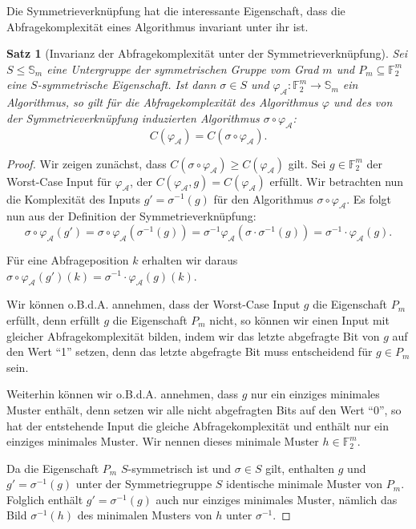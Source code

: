 \documentclass[10pt,a4paper, footheight=1mm]{scrreprt}
\newtheorem{Satz}[definition]{Satz}
\theoremstyle{definition}
\begin{document}
Die Symmetrieverknüpfung hat die interessante Eigenschaft,
dass die Abfragekomplexität eines Algorithmus invariant unter
ihr ist.

\begin{Satz}[Invarianz der Abfragekomplexität unter der Symmetrieverknüpfung]
Sei $S\leq \mathbb{S}_m$ eine Untergruppe der symmetrischen Gruppe vom
Grad $m$ und $P_m \subseteq\mathbb{F}_2^m$ eine $S$-symmetrische
Eigenschaft. Ist dann $\sigma \in S$ und
$\varphi_\mathcal{A}:\mathbb{F}_2^m \to \mathbb{S}_m$ ein Algorithmus,
so gilt für die Abfragekomplexität des Algorithmus $\varphi$
und des von der Symmetrieverknüpfung induzierten Algorithmus
$\sigma \circ \varphi_\mathcal{A}$:
$$C(\varphi_\mathcal{A}) = C(\sigma \circ \varphi_\mathcal{A}).$$
\end{Satz}
\begin{proof}
Wir zeigen zunächst, dass 
$C(\sigma \circ \varphi_\mathcal{A}) \geq C(\varphi_\mathcal{A})$ gilt. 
Sei $g\in\mathbb{F}_2^m$ der Worst-Case Input für $\varphi_\mathcal{A}$,
der $C(\varphi_\mathcal{A}, g) = C(\varphi_\mathcal{A})$ erfüllt.
Wir betrachten nun die Komplexität des Inputs $g' = \sigma^{-1}(g)$
für den Algorithmus $\sigma \circ \varphi_\mathcal{A}$.
Es folgt nun aus der Definition der Symmetrieverknüpfung:
\begin{equation}
\label{eq:Symmetrie}
\sigma \circ \varphi_\mathcal{A} (g')
= \sigma \circ \varphi_\mathcal{A} (\sigma^{-1}(g)) 
= \sigma^{-1} \varphi_\mathcal{A}(\sigma \cdot \sigma^{-1} (g))
= \sigma^{-1} \cdot \varphi_\mathcal{A}(g).
\end{equation}

Für eine Abfrageposition $k$ erhalten wir daraus 
$\sigma \circ \varphi_\mathcal{A}(g')(k) 
= \sigma^{-1} \cdot \varphi_\mathcal{A}(g)(k)$.

Wir können o.B.d.A. annehmen, dass der Worst-Case Input $g$ die
Eigenschaft $P_m$ erfüllt, denn erfüllt $g$ die Eigenschaft
$P_m$ nicht, so können wir einen Input  mit gleicher
Abfragekomplexität bilden, indem wir das letzte abgefragte
Bit von $g$ auf den Wert "`1"' setzen, denn das letzte
abgefragte Bit muss entscheidend für $g\in P_m$ sein.

Weiterhin können wir o.B.d.A. annehmen, dass $g$ nur 
ein einziges minimales Muster enthält, denn setzen wir
alle nicht abgefragten Bits auf den Wert "`0"', so hat
der entstehende Input die gleiche Abfragekomplexität
und enthält nur ein einziges minimales Muster.
Wir nennen dieses minimale Muster $h\in \mathbb{F}_2^m$.

Da die Eigenschaft $P_m$ $S$-symmetrisch ist und 
$\sigma\in S$ gilt, enthalten $g$ und $g'=\sigma^{-1}(g)$
unter der Symmetriegruppe $S$ identische minimale Muster von $P_m$.
Folglich enthält $g'=\sigma^{-1}(g)$ auch nur einziges minimales Muster,
nämlich das Bild $\sigma^{-1}(h)$ des minimalen Musters von $h$ unter
$\sigma^{-1}$.


\end{proof}
\end{document}
